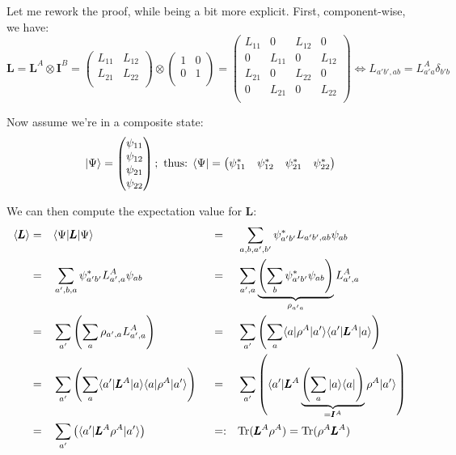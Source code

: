 \documentclass[solutions.tex]{subfiles}
\begin{document}
Let me rework the proof, while being a bit more explicit. First,
component-wise, we have:
\[
	\bm{L} = \bm{L}^A\otimes\bm{I}^B = \begin{pmatrix}
		L_{11} & L_{12} \\
		L_{21} & L_{22} \\
	\end{pmatrix}\otimes\begin{pmatrix}
		1 & 0 \\
		0 & 1 \\
	\end{pmatrix} = \begin{pmatrix}
		L_{11} & 0      & L_{12} & 0      \\
		0      & L_{11} & 0      & L_{12} \\
		L_{21} & 0      & L_{22} & 0      \\
		0      & L_{21} & 0      & L_{22} \\
	\end{pmatrix} \Leftrightarrow
	L_{a'b',ab} = L_{a'a}^A\delta_{b'b}
\]

Now assume we're in a composite state:
\[
	|\Psi\rangle = \begin{pmatrix}
		\psi_{11} \\
		\psi_{12} \\
		\psi_{21} \\
		\psi_{22} \\
	\end{pmatrix};\text{ thus: }\langle \Psi| = \begin{pmatrix}
		\psi_{11}^* & \psi_{12}^* & \psi_{21}^* & \psi_{22}^* \\
	\end{pmatrix}
\]

We can then compute the expectation value for $\bm{L}$:
\begin{equation*}\begin{aligned}
	\left\langle \pmb{L} \right\rangle &=&& \langle \Psi|\pmb{L}|\Psi\rangle &
	~ &=&& \sum_{a,b,a',b'}\psi_{a'b'}^*L_{a'b',ab}\psi_{ab} \\
	~ &=&& \sum_{a',b,a}\psi_{a'b'}^*L^A_{a',a}\psi_{ab} &
	~ &=&& \sum_{a',a}\underbrace{
		\left(\sum_{b}\psi_{a'b'}^*\psi_{ab}\right)
	}_{\rho_{a'a}} L^A_{a',a} \\
	~ &=&& \sum_{a'}\left(\sum_a\rho_{a',a}L_{a',a}^A\right) &
	~ &=&& \sum_{a'}\left(\sum_a\langle a|\rho^A|a'\rangle\langle a'|\pmb{L}^A|a\rangle\right) \\
	~ &=&& \sum_{a'}\left(\sum_a\langle a'|\pmb{L}^A|a\rangle\langle a|\rho^A|a'\rangle\right) &
	~ &=&& \sum_{a'}\left(\langle a'|\pmb{L}^A
		\underbrace{\left(\sum_a|a\rangle\langle a|\right)}_{=\pmb{I}^A}
		\rho^A|a'\rangle\right) \\
	~ &=&& \sum_{a'}\left(\langle a'|\pmb{L}^A\rho^A|a'\rangle\right) &
	~ &=:&& \text{Tr}(\pmb{L}^A\rho^A) = \text{Tr}(\rho^A\pmb{L}^A) \\
\end{aligned}\end{equation*}
\end{document}
